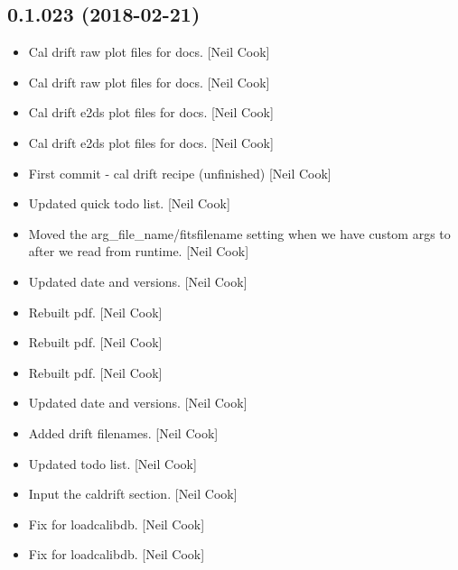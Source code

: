 \documentclass[a4paper,10pt,english]{report}
\begin{document}
\subsection{0.1.023 (2018-02-21)}
\label{\detokenize{misc/changelog:id479}}\begin{itemize}
\item {} 
Cal drift raw plot files for docs. {[}Neil Cook{]}

\item {} 
Cal drift raw plot files for docs. {[}Neil Cook{]}

\item {} 
Cal drift e2ds plot files for docs. {[}Neil Cook{]}

\item {} 
Cal drift e2ds plot files for docs. {[}Neil Cook{]}

\item {} 
First commit - cal drift recipe (unfinished) {[}Neil Cook{]}

\item {} 
Updated quick todo list. {[}Neil Cook{]}

\item {} 
Moved the arg\_file\_name/fitsfilename setting when we have custom args
to after we read from runtime. {[}Neil Cook{]}

\item {} 
Updated date and versions. {[}Neil Cook{]}

\item {} 
Rebuilt pdf. {[}Neil Cook{]}

\item {} 
Rebuilt pdf. {[}Neil Cook{]}

\item {} 
Rebuilt pdf. {[}Neil Cook{]}

\item {} 
Updated date and versions. {[}Neil Cook{]}

\item {} 
Added drift filenames. {[}Neil Cook{]}

\item {} 
Updated todo list. {[}Neil Cook{]}

\item {} 
Input the caldrift section. {[}Neil Cook{]}

\item {} 
Fix for loadcalibdb. {[}Neil Cook{]}

\item {} 
Fix for loadcalibdb. {[}Neil Cook{]}

\end{itemize}
\end{document}
